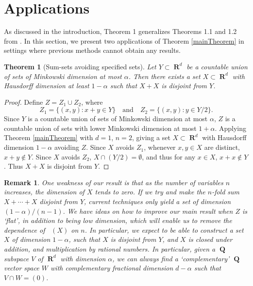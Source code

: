 \documentclass[dvipsnames,letterpaper,12pt]{article}
\numberwithin{equation}{section}
\theoremstyle{plain}
\newtheorem{theorem}{Theorem}
\newtheorem*{remark}{Remark}
\DeclareMathOperator{\hausdim}{\dim_{\mathbf{H}}}
\DeclareMathOperator{\RR}{\mathbf{R}}
\DeclareMathOperator{\QQ}{\mathbf{Q}}
\begin{document}
\section{Applications}\label{applications}

As discussed in the introduction, Theorem 1 generalizes Theorems 1.1 and 1.2 from \cite{MalabikaRob}. In this section, we present two applications of Theorem \ref{mainTheorem} in settings where previous methods cannot obtain any results.

\begin{theorem}[Sum-sets avoiding specified sets]
	Let $Y \subset \RR^d$ be a countable union of sets of Minkowski dimension at most $\alpha$. Then there exists a set $X \subset \RR^d$ with Hausdorff dimension at least $1 - \alpha$ such that $X + X$ is disjoint from $Y$.
\end{theorem}
\begin{proof}
	Define $Z = Z_1 \cup Z_2$, where
	\[ Z_1 = \{ (x,y) : x + y \in Y \} \quad \text{and} \quad Z_2 = \{ (x,y): y \in Y/2 \}. \]
	Since $Y$ is a countable union of sets of Minkowski dimension at most $\alpha$, $Z$ is a countable union of sets with lower Minkowski dimension at most $1 + \alpha$. Applying Theorem \ref{mainTheorem} with $d = 1$, $n = 2$, giving a set $X \subset \RR^d$ with Hausdorff dimension $1 - \alpha$ avoiding $Z$. Since $X$ avoids $Z_1$, whenever $x,y \in X$ are distinct, $x + y \not \in Y$. Since $X$ avoids $Z_2$, $X \cap (Y/2) = \emptyset$, and thus for any $x \in X$, $x + x \not \in Y$. Thus $X + X$ is disjoint from $Y$.
\end{proof}

\begin{remark}
	One weakness of our result is that as the number of variables $n$ increases, the dimension of $X$ tends to zero. If we try and make the $n$-fold sum $X + \cdots + X$ disjoint from $Y$, current techniques only yield a set of dimension $(1 - \alpha)/(n-1)$. We have ideas on how to improve our main result when $Z$ is `flat', in addition to being low dimension, which will enable us to remove the dependence of $\hausdim(X)$ on $n$. In particular, we expect to be able to construct a set $X$ of dimension $1 - \alpha$, such that $X$ is disjoint from $Y$, and $X$ is closed under addition, and multiplication by rational numbers. In particular, given a $\QQ$ subspace $V$ of $\RR^d$ with dimension $\alpha$, we can always find a `complementary' $\QQ$ vector space $W$ with complementary fractional dimension $d - \alpha$ such that $V \cap W = (0)$.
\end{remark}
\end{document}
